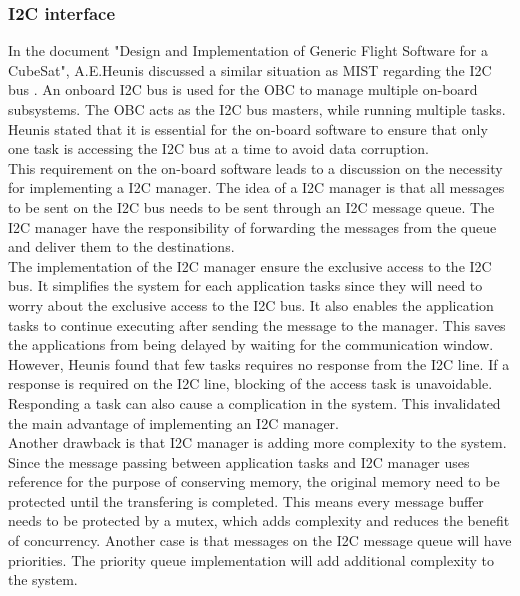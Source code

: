\documentclass[a4paper]{article}
\begin{document}
\subsubsection{I2C interface}
In the document "Design and Implementation of Generic Flight Software for a CubeSat", A.E.Heunis discussed a similar situation as MIST regarding the I2C bus \cite{I2C}. An onboard I2C bus is used for the OBC to manage multiple on-board subsystems. The OBC acts as the I2C bus masters, while running multiple tasks. Heunis stated that it is essential for the on-board software to ensure that only one task is accessing the I2C bus at a time to avoid data corruption. \\
\indent This requirement on the on-board software leads to a discussion on the necessity for implementing a I2C manager. The idea of a I2C manager is that all messages to be sent on the I2C bus needs to be sent through an I2C message queue. The I2C manager have the responsibility of forwarding the messages from the queue and deliver them to the destinations. \\
\indent The implementation of the I2C manager ensure the exclusive access to the I2C bus. It simplifies the system for each application tasks since they will need to worry about the exclusive access to the I2C bus. It also enables the application tasks to continue executing after sending the message to the manager. This saves the applications from being delayed by waiting for the communication window. \\
\indent However, Heunis found that few tasks requires no response from the I2C line. If a response is required on the I2C line, blocking of the access task is unavoidable. Responding a task can also cause a complication in the system. This invalidated the main advantage of implementing an I2C manager. \\
\indent Another drawback is that I2C manager is adding more complexity to the system. Since the message passing between application tasks and I2C manager uses reference for the purpose of conserving memory, the original memory need to be protected until the transfering is completed. This means every message buffer needs to be protected by a mutex, which adds complexity and reduces the benefit of concurrency. Another case is that messages on the I2C message queue will have priorities. The priority queue implementation will add additional complexity to the system.\\ 



\end{document}
